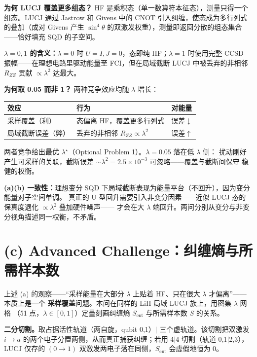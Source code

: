 \documentclass[11pt,a4paper]{article}
\begin{document}
\textbf{为何 LUCJ 覆盖更多组态？} HF 是乘积态（单一数算符本征态），测量只得一个组态。LUCJ 通过
Jastrow 和 Givens 中的 CNOT 引入纠缠，使态成为多行列式的叠加（成对 Givens 产生 $\sin^4\theta$
的双激发权重），测量即返回分散的组态集合——恰好填充 SQD 的子空间。

\textbf{$\lambda=0,1$ 的含义：}$\lambda=0$ 时 $U=I,J=0$，态即纯 HF；$\lambda=1$ 时使用完整 CCSD
振幅——在理想电路里驱动能量至 FCI，但在局域截断 LUCJ 中被丢弃的非相邻 $R_{ZZ}$ 贡献
$\propto\lambda^2$ 达最大。

\textbf{为何取 0.05 而非 1？} 两种竞争效应均随 $\lambda$ 增长：
\begin{center}
\begin{tabular}{@{}p{3.5cm}p{4.2cm}p{3cm}@{}}\toprule
效应 & 行为 & 对能量\\\midrule
采样覆盖（利）& 态偏离 HF，覆盖更多行列式 & 误差$\downarrow$\\[3pt]
局域截断误差（弊）& 丢弃的非相邻 $R_{ZZ}\propto\lambda^2$ & 误差$\uparrow$\\\bottomrule
\end{tabular}
\end{center}
两者竞争给出最优 $\lambda^\star$（Optional Problem 1）。$\lambda=0.05$ 落在低 $\lambda$ 侧：
扰动刚好产生可采样的关联，截断误差 $\sim\!\lambda^2=2.5\times10^{-3}$ 可忽略——覆盖与截断间保守
稳健的权衡。

\begin{keybox}
\textbf{(a)(b) 一致性：}理想变分 SQD 下局域截断表现为能量平台（不回升），因为变分能量对子空间单调。
真正的 U 型回升需要引入非变分因素——近似 LUCJ 态的保真度退化 $\propto\!\lambda^2$ 叠加硬件噪声——
才会在大 $\lambda$ 端回升。两问分别从变分与非变分视角描述同一权衡，不矛盾。
\end{keybox}

\section{(c) Advanced Challenge：纠缠熵与所需样本数}
上述 (a) 的观察——“采样能量在大部分 $\lambda$ 上贴着 HF、只在很大 $\lambda$ 才偏离”——本质上是一个
\textbf{采样覆盖}问题。本问在同样的 LiH 局域 LUCJ 族上，用密集 $\lambda$ 网格
（51 点，$\lambda\in[0,1]$）定量刻画纠缠熵 $S_{\mathrm{ent}}$ 与所需样本数 $S$ 的关系。

\textbf{二分切割。}取占据活性轨道（两自旋，qubit 0,1）$|$ 三个虚轨道。该切割把双激发
$i\!\to\!a$ 的两个电子分置两侧，从而真正捕获纠缠；若用 4$|$4 切割（轨道 0,1$|$2,3），LUCJ 仅存的
$(0\!\to\!1)$ 双激发两电子落在同侧，$S_{\mathrm{ent}}$ 会虚假地恒为 0。
\end{document}

